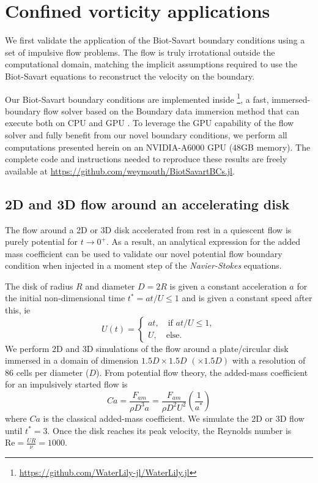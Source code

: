\documentclass[final,1p,times]{elsarticle}
\begin{document}
\section{Confined vorticity applications}

We first validate the application of the Biot-Savart boundary conditions using a set of impulsive flow problems. The flow is truly irrotational outside the computational domain, matching the implicit assumptions required to use the Biot-Savart equations to reconstruct the velocity on the boundary. 

Our Biot-Savart boundary conditions are implemented inside \textbf{}\footnote{\url{https://github.com/WaterLily-jl/WaterLily.jl}}, a fast, immersed-boundary flow solver based on the Boundary data immersion method \cite{Maertens2015} that can execute both on CPU and GPU \cite{Weymouth2023WaterLily.jl:Execution}. To leverage the GPU capability of the flow solver and fully benefit from our novel boundary conditions, we perform all computations presented herein on an NVIDIA-A6000 GPU (48GB memory). The complete code and instructions needed to reproduce these results are freely available at \url{https://github.com/weymouth/BiotSavartBCs.jl}.

\subsection{2D and 3D flow around an accelerating disk}

The flow around a 2D or 3D disk accelerated from rest in a quiescent flow is purely potential for $t\to 0^+$. As a result, an analytical expression for the added mass coefficient can be used to validate our novel potential flow boundary condition when injected in a moment step of the \emph{Navier-Stokes} equations. 

The disk of radius $R$ and diameter $D=2R$ is given a constant acceleration $a$ for the initial non-dimensional time $t^*=at/U\le 1$ and is given a constant speed after this, ie
\begin{equation}
    U(t) = \begin{cases}
        at, \quad \text{if } at/U\le1,\\
        U, \quad \text{else}.
    \end{cases}
\end{equation}
We perform 2D and 3D simulations of the flow around a plate/circular disk immersed in a domain of dimension $1.5D\times1.5D\,\,(\times1.5D)$ with a resolution of 86 cells per diameter ($D$). From potential flow theory, the added-mass coefficient for an impulsively started flow is
\begin{equation}
    Ca  = \frac{F_{am}}{\rho D^3 a} = \frac{F_{am}}{\rho D^2U^2}\left(\frac{1}{a^*}\right) %
\end{equation}
where $Ca$ is the classical added-mass coefficient. We simulate the 2D or 3D flow until $t^*=3$. Once the disk reaches its peak velocity, the Reynolds number is $\text{Re}=\frac{UR}{\nu}=1000$.
\end{document}

